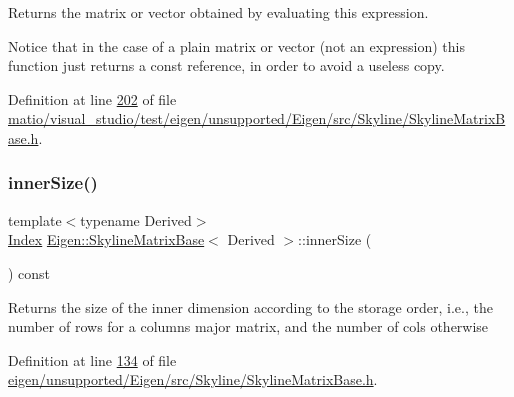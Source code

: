 \begin{DoxyReturn}{Returns}
the matrix or vector obtained by evaluating this expression.
\end{DoxyReturn}
Notice that in the case of a plain matrix or vector (not an expression) this function just returns a const reference, in order to avoid a useless copy. 

Definition at line \hyperlink{matio_2visual__studio_2test_2eigen_2unsupported_2_eigen_2src_2_skyline_2_skyline_matrix_base_8h_source_l00202}{202} of file \hyperlink{matio_2visual__studio_2test_2eigen_2unsupported_2_eigen_2src_2_skyline_2_skyline_matrix_base_8h_source}{matio/visual\+\_\+studio/test/eigen/unsupported/\+Eigen/src/\+Skyline/\+Skyline\+Matrix\+Base.\+h}.

\mbox{\label{class_eigen_1_1_skyline_matrix_base_a901f2691facc1a0321740300dc7a12d7}} 
\subsubsection{\texorpdfstring{inner\+Size()}{innerSize()}\hspace{0.1cm}{\footnotesize\ttfamily [1/2]}}
{\footnotesize\ttfamily template$<$typename Derived$>$ \\
\hyperlink{group___core___module_a554f30542cc2316add4b1ea0a492ff02}{Index} \hyperlink{class_eigen_1_1_skyline_matrix_base}{Eigen\+::\+Skyline\+Matrix\+Base}$<$ Derived $>$\+::inner\+Size (\begin{DoxyParamCaption}{ }\end{DoxyParamCaption}) const\hspace{0.3cm}{\ttfamily [inline]}}

\begin{DoxyReturn}{Returns}
the size of the inner dimension according to the storage order, i.\+e., the number of rows for a columns major matrix, and the number of cols otherwise 
\end{DoxyReturn}


Definition at line \hyperlink{eigen_2unsupported_2_eigen_2src_2_skyline_2_skyline_matrix_base_8h_source_l00134}{134} of file \hyperlink{eigen_2unsupported_2_eigen_2src_2_skyline_2_skyline_matrix_base_8h_source}{eigen/unsupported/\+Eigen/src/\+Skyline/\+Skyline\+Matrix\+Base.\+h}.

